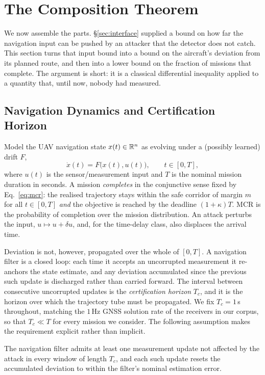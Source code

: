 \section{The Composition Theorem}
\label{sec:theorem}
We now assemble the parts. \S\ref{sec:interface} supplied a bound on how far the
navigation input can be pushed by an attacker that the detector does not catch.
This section turns that input bound into a bound on the aircraft's deviation
from its planned route, and then into a lower bound on the fraction of missions
that complete. The argument is short: it is a classical differential inequality
applied to a quantity that, until now, nobody had measured.

\subsection{Navigation Dynamics and Certification Horizon}
Model the UAV navigation state $x(t)\in\mathbb{R}^n$ as evolving under a (possibly
learned) drift $F$,
\begin{equation}
\label{eq:ode}
\dot{x}(t) = F\big(x(t), u(t)\big), \qquad t\in[0,T],
\end{equation}
where $u(t)$ is the sensor/measurement input and $T$ is the nominal mission
duration in seconds. A mission \emph{completes} in the conjunctive sense fixed
by Eq.~\eqref{eq:mcr}: the realised trajectory stays within the safe corridor of
margin $m$ for all $t\in[0,T]$ \emph{and} the objective is reached by the
deadline $(1+\kappa)T$. MCR is the probability of completion over the mission
distribution. An attack perturbs the input, $u\mapsto u+\delta u$, and, for the
time-delay class, also displaces the arrival time.

Deviation is not, however, propagated over the whole of $[0,T]$. A navigation
filter is a closed loop: each time it accepts an uncorrupted measurement it
re-anchors the state estimate, and any deviation accumulated since the previous
such update is discharged rather than carried forward. The interval between
consecutive uncorrupted updates is the \emph{certification horizon} $T_c$, and
it is the horizon over which the trajectory tube must be propagated. We fix
$T_c=1$\,s throughout, matching the $1$\,Hz GNSS solution rate of the receivers
in our corpus, so that $T_c\ll T$ for every mission we consider. The following
assumption makes the requirement explicit rather than implicit.

\begin{definition}
\label{def:reanchor}
The navigation filter admits at least one measurement update not affected by the
attack in every window of length $T_c$, and each such update resets the
accumulated deviation to within the filter's nominal estimation error.
\end{definition}

